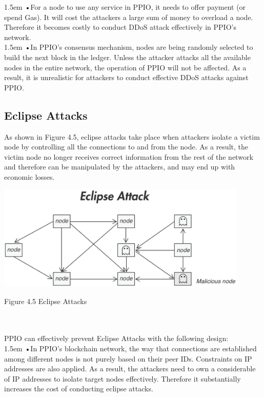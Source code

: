 \documentclass[10pt,a4paper]{article}
\begin{document}
\hangindent 1.5em
\noindent   
•\quad For a node to use any service in PPIO, it needs to offer payment (or spend Gas). It will cost the attackers a large sum of money to overload a node.  Therefore it becomes costly to conduct DDoS attack effectively in PPIO’s network.
   \vspace{-0.8em}
\\

\hangindent 1.5em
\noindent   
•\quad In PPIO’s consensus mechanism, nodes are being randomly selected to build the next block in the ledger. Unless the attacker attacks all the available nodes in the entire network, the operation of PPIO will not be affected. As a result, it is unrealistic for attackers to conduct effective DDoS attacks against PPIO.
   \vspace{-0.5em}
      \subsection{Eclipse Attacks}  %
As shown in Figure 4.5, eclipse attacks take place when attackers isolate a victim node by controlling all the connections to and from the node. As a result, the victim node no longer receives correct information from the rest of the network and therefore can be manipulated by the attackers, and may end up with economic losses.
\\
\centerline{\includegraphics[width=340pt]{fig19}}
 \centerline{{Figure 4.5 Eclipse Attacks }}
    \vspace{-1.5em}
\\ \\PPIO can effectively prevent Eclipse Attacks with the following design:
    \vspace{-0.6em}
\\

\hangindent 1.5em
\noindent   
•\quad In PPIO’s blockchain network,  the way that connections are established among different nodes is not purely based on their peer IDs. Constraints on IP addresses are also applied. As a result, the attackers need to own a considerable of IP addresses to isolate target nodes effectively. Therefore it substantially increases the cost of conducting eclipse attacks.
   \vspace{-0.6em}
\\
\end{document}
